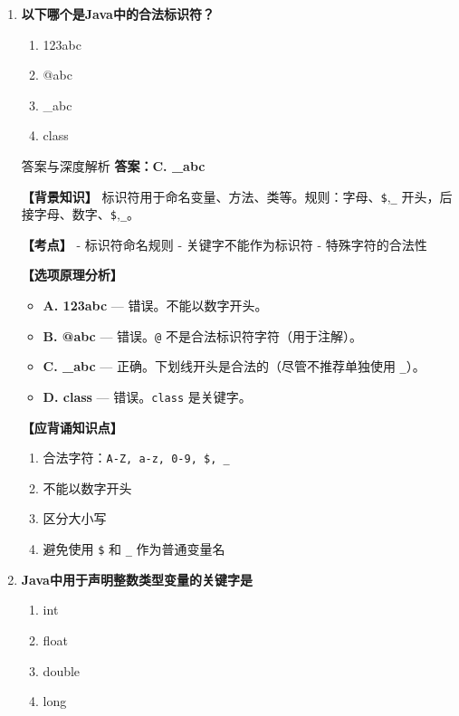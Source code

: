 \documentclass[12pt, a4paper]{ctexart} %
\newcommand{\code}[1]{\texttt{#1}}
\begin{document}
\begin{enumerate}[label=\textbf{\arabic*.}]
	      \vspace{1em}

	\item \textbf{以下哪个是Java中的合法标识符？}
	      \begin{enumerate}[label=\Alph*.]
		      \item 123abc
		      \item @abc
		      \item \_abc
		      \item class
	      \end{enumerate}

	      \begin{bluebox}{答案与深度解析}
		      \textbf{答案：C. \_abc}

		      \textbf{【背景知识】}
		      标识符用于命名变量、方法、类等。规则：字母、\code{\$},\code{\_} 开头，后接字母、数字、\code{\$},\code{\_}。

		      \textbf{【考点】}
		      - 标识符命名规则
		      - 关键字不能作为标识符
		      - 特殊字符的合法性

		      \textbf{【选项原理分析】}
		      \begin{itemize}[leftmargin=*]
			      \item \textbf{A. 123abc} — 错误。不能以数字开头。
			      \item \textbf{B. @abc} — 错误。\code{@} 不是合法标识符字符（用于注解）。
			      \item \textbf{C. \_abc} — 正确。下划线开头是合法的（尽管不推荐单独使用 \code{\_}）。
			      \item \textbf{D. class} — 错误。\code{class} 是关键字。
		      \end{itemize}

		      \textbf{【应背诵知识点】}
		      \begin{enumerate}
			      \item 合法字符：\code{A-Z,\ a-z,\ 0-9,\ \$,\ \_}
			      \item 不能以数字开头
			      \item 区分大小写
			      \item 避免使用 \code{\$} 和 \code{\_} 作为普通变量名
		      \end{enumerate}
	      \end{bluebox}

	      \vspace{1em}

	\item \textbf{Java中用于声明整数类型变量的关键字是}
	      \begin{enumerate}[label=\Alph*.]
		      \item int
		      \item float
		      \item double
		      \item long
	      \end{enumerate}


\end{enumerate}
\end{document}
